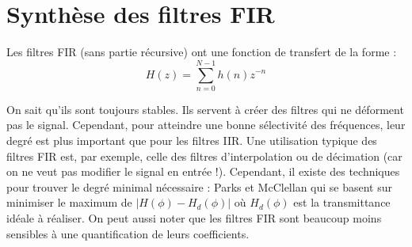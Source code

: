     \section{Synthèse des filtres FIR}
        Les filtres FIR (sans partie récursive) ont une fonction de transfert de la forme :
        $$
            H(z) = \sum_{n=0}^{N-1} h(n)z^{-n}
        $$

        On sait qu'ils sont toujours stables. Ils servent à créer des filtres qui ne déforment pas le signal. Cependant, pour atteindre une bonne sélectivité des fréquences, leur degré est plus important que pour les filtres IIR. Une utilisation typique des filtres FIR est, par exemple, celle des filtres d'interpolation ou de décimation (car on ne veut pas modifier le signal en entrée !). Cependant, il existe des techniques pour trouver le degré minimal nécessaire : Parks et McClellan qui se basent sur minimiser le maximum de $|H(\phi) - H_d(\phi)|$ où $H_d(\phi)$ est la transmittance idéale à réaliser. On peut aussi noter que les filtres FIR sont beaucoup moins sensibles à une quantification de leurs coefficients.